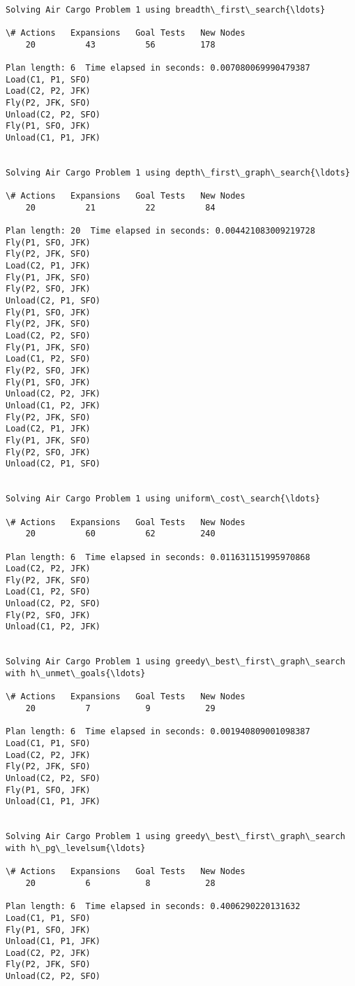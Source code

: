 \documentclass[11pt]{article}
\begin{document}
    \begin{Verbatim}[commandchars=\\\{\}]

Solving Air Cargo Problem 1 using breadth\_first\_search{\ldots}

\# Actions   Expansions   Goal Tests   New Nodes
    20          43          56         178    

Plan length: 6  Time elapsed in seconds: 0.007080069990479387
Load(C1, P1, SFO)
Load(C2, P2, JFK)
Fly(P2, JFK, SFO)
Unload(C2, P2, SFO)
Fly(P1, SFO, JFK)
Unload(C1, P1, JFK)


Solving Air Cargo Problem 1 using depth\_first\_graph\_search{\ldots}

\# Actions   Expansions   Goal Tests   New Nodes
    20          21          22          84    

Plan length: 20  Time elapsed in seconds: 0.004421083009219728
Fly(P1, SFO, JFK)
Fly(P2, JFK, SFO)
Load(C2, P1, JFK)
Fly(P1, JFK, SFO)
Fly(P2, SFO, JFK)
Unload(C2, P1, SFO)
Fly(P1, SFO, JFK)
Fly(P2, JFK, SFO)
Load(C2, P2, SFO)
Fly(P1, JFK, SFO)
Load(C1, P2, SFO)
Fly(P2, SFO, JFK)
Fly(P1, SFO, JFK)
Unload(C2, P2, JFK)
Unload(C1, P2, JFK)
Fly(P2, JFK, SFO)
Load(C2, P1, JFK)
Fly(P1, JFK, SFO)
Fly(P2, SFO, JFK)
Unload(C2, P1, SFO)


Solving Air Cargo Problem 1 using uniform\_cost\_search{\ldots}

\# Actions   Expansions   Goal Tests   New Nodes
    20          60          62         240    

Plan length: 6  Time elapsed in seconds: 0.011631151995970868
Load(C2, P2, JFK)
Fly(P2, JFK, SFO)
Load(C1, P2, SFO)
Unload(C2, P2, SFO)
Fly(P2, SFO, JFK)
Unload(C1, P2, JFK)


Solving Air Cargo Problem 1 using greedy\_best\_first\_graph\_search with h\_unmet\_goals{\ldots}

\# Actions   Expansions   Goal Tests   New Nodes
    20          7           9           29    

Plan length: 6  Time elapsed in seconds: 0.001940809001098387
Load(C1, P1, SFO)
Load(C2, P2, JFK)
Fly(P2, JFK, SFO)
Unload(C2, P2, SFO)
Fly(P1, SFO, JFK)
Unload(C1, P1, JFK)


Solving Air Cargo Problem 1 using greedy\_best\_first\_graph\_search with h\_pg\_levelsum{\ldots}

\# Actions   Expansions   Goal Tests   New Nodes
    20          6           8           28    

Plan length: 6  Time elapsed in seconds: 0.4006290220131632
Load(C1, P1, SFO)
Fly(P1, SFO, JFK)
Unload(C1, P1, JFK)
Load(C2, P2, JFK)
Fly(P2, JFK, SFO)
Unload(C2, P2, SFO)



\end{Verbatim}
\end{document}
